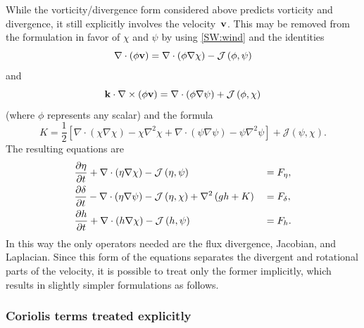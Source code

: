 \documentclass[12pt]{article}
\newcommand{\cross}{\times}
\newcommand{\del}{\nabla}
\newcommand{\laplacian}[1]{\del^2#1}
\newcommand{\fluxdiv}[2]{\del\cdot\left(#1\del#2\right)}
\newcommand{\jacobian}[2]{\mathcal{J}\left(#1,#2\right)}
\begin{document}
While the vorticity/divergence form considered above predicts vorticity and
divergence, it still explicitly involves the velocity~$\mathbf{v}$.  This may be
removed from the formulation in favor of $\chi$ and $\psi$ by using
\eqref{SW:wind} and the identities
\begin{equation}
   \del\cdot(\phi\vecv) = 
      \del\cdot(\phi\del\chi) - \jacobian{\phi}{\psi}
\label{eq:identity1}
\end{equation}
and
\begin{equation}
   \veck\cdot\del\cross(\phi\vecv) = 
      \del\cdot(\phi\del\psi) + \jacobian{\phi}{\chi}
\label{eq:identity2}
\end{equation}
(where $\phi$ represents any scalar) and the formula
\begin{equation}
   K = \frac12\left[ \fluxdiv{\chi}{\chi} - \chi\laplacian\chi
                   + \fluxdiv{\psi}{\psi} - \psi\laplacian\psi \right]
      + \jacobian{\psi}{\chi}.
\label{defK}
\end{equation}
The resulting equations are
\begin{alignat}{2}
   &\frac{\partial \eta}{\partial t} 
   + \del\cdot(\eta\del\chi) - \jacobian{\eta}{\psi} &&= \Feta ,
\label{SFVP:vorticity}
\\
   &\frac{\partial \delta}{\partial t} 
   - \del\cdot(\eta\del\psi) - \jacobian{\eta}{\chi} 
   + \del^2 \left(gh + K\right) &&= \Fdelta ,
\label{SFVP:divergence}
\\
  &\frac{\partial h}{\partial t} 
   + \del\cdot(h\del\chi) - \jacobian{h}{\psi} &&= \Fmass .
\label{SFVP:continuity}
\end{alignat}
In this way the only operators needed are the flux divergence, Jacobian, and
Laplacian.  Since this form of the equations separates the divergent and
rotational parts of the velocity, it is possible to treat only the former
implicitly, which results in slightly simpler formulations as follows.

\pagebreak[2]
\subsubsection{Coriolis terms treated explicitly}
\end{document}

